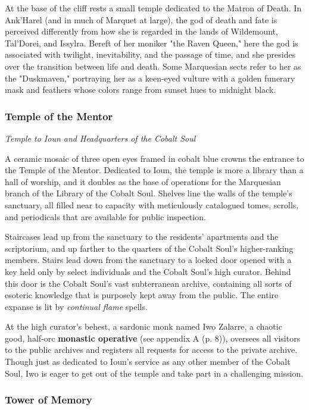 \documentclass[letterpaper, 11pt, bg=full, twocolumn]{dndbook}
\begin{document}
At the base of the cliff rests a small temple dedicated to the Matron of Death. In Ank'Harel (and in much of Marquet at large), the god of death and fate is perceived differently from how she is regarded in the lands of Wildemount, Tal'Dorei, and Issylra. Bereft of her moniker "the Raven Queen," here the god is associated with twilight, inevitability, and the passage of time, and she presides over the transition between life and death. Some Marquesian sects refer to her as the "Duskmaven," portraying her as a keen-eyed vulture with a golden funerary mask and feathers whose colors range from sunset hues to midnight black.

\subsubsection{Temple of the Mentor}

\textit{Temple to Ioun and Headquarters of the Cobalt Soul}

A ceramic mosaic of three open eyes framed in cobalt blue crowns the entrance to the Temple of the Mentor. Dedicated to Ioun, the temple is more a library than a hall of worship, and it doubles as the base of operations for the Marquesian branch of the Library of the Cobalt Soul. Shelves line the walls of the temple's sanctuary, all filled near to capacity with meticulously catalogued tomes, scrolls, and periodicals that are available for public inspection.

Staircases lead up from the sanctuary to the residents' apartments and the scriptorium, and up farther to the quarters of the Cobalt Soul's higher-ranking members. Stairs lead down from the sanctuary to a locked door opened with a key held only by select individuals and the Cobalt Soul's high curator. Behind this door is the Cobalt Soul's vast subterranean archive, containing all sorts of esoteric knowledge that is purposely kept away from the public. The entire expanse is lit by \textit{continual flame} spells.

At the high curator's behest, a sardonic monk named Iwo Zalarre, a chaotic good, half-orc \textbf{monastic operative} (see appendix A (p. 8)), oversees all visitors to the public archives and registers all requests for access to the private archive. Though just as dedicated to Ioun's service as any other member of the Cobalt Soul, Iwo is eager to get out of the temple and take part in a challenging mission.

\subsubsection{Tower of Memory}
\end{document}
